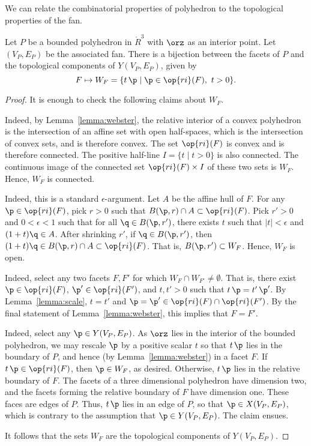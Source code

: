 We can relate the combinatorial properties of polyhedron to the topological
properties of the fan.

\begin{lemma}[]\cutrate{}\label{lemma:WF} 
Let $P$ be a bounded polyhedron in $\ring{R}^3$ with $\orz$ as an
interior point.  Let $(V_P,E_P)$ be the associated fan.  There is a
bijection between the facets of $P$ and the topological components
of $Y(V_P,E_P)$, given by
\[ 
F \mapsto W_F = \{t\, \p \mid \p\in \op{ri}(F),~t >0\}.
\] 
\end{lemma}
%
%
%

\begin{proof} It is enough to check the following claims
about $W_F$.

 Indeed, by Lemma~\ref{lemma:webster},
the relative interior of a convex polyhedron is the intersection of
an affine set with open half-spaces, which is the intersection of
convex sets, and is therefore convex. The set $\op{ri}(F)$ is
convex and is therefore connected.  The positive half-line $I=\{t\mid t>0\}$
is also connected.  The continuous image of the connected set
$\op{ri}(F)\times I$ of these two sets is $W_F$.  Hence, $W_F$ is
connected.

  Indeed, this is a standard
$\epsilon$-argument.  Let $A$ be the affine hull of $F$.  For any
$\p\in \op{ri}(F)$, pick $r>0$ such that $B(\p,r)\cap A\subset
\op{ri}(F)$.  Pick $r'>0$ and $0<\epsilon<1$ such that for all
$\q\in B(\p,r')$, there exists $t$ such that $|t|<\epsilon$ and
$(1+t)\q\in A$.  After shrinking $r'$, if $\q\in B(\p,r')$, then
$(1+t)\q \in B(\p,r)\cap A \subset \op{ri}(F)$.  That is,
$B(\p,r')\subset W_F$.  Hence, $W_F$ is open.

  Indeed, select any two facets $F,F'$ for
which $W_F\cap W_{F'}\ne \emptyset$.  That is, there exist $\p\in
\op{ri}(F)$, $\p'\in \op{ri}(F')$, and $t,t'>0$ such that $t\, \p = t'\,
\p'$.  By Lemma~\ref{lemma:scale}, $t=t'$ and $\p=\p'\in \op{ri}(F)\cap
\op{ri}(F')$.  By the final statement of Lemma~\ref{lemma:webster},
this implies that $F=F'$.

  Indeed,
select any $\p\in Y(V_P,E_P)$.  As $\orz$ lies in the interior of
the bounded polyhedron, we may rescale $\p$ by a positive scalar $t$
so that $t\, \p$ lies in the boundary of $P$, and hence (by
Lemma~\ref{lemma:webster}) in a facet $F$.  If $t\, \p \in
\op{ri}(F)$, then $\p\in W_F$, as desired.  Otherwise, $t\, \p$ lies
in the relative boundary of $F$.  The facets of a three dimensional
polyhedron have dimension two, and the facets forming the relative
boundary of $F$ have dimension one.  These faces are edges of $P$.
Thus, $t\, \p$ lies in an edge of $P$, so that $\p\in X(V_P,E_P)$,
which is contrary to the assumption that $\p\in Y(V_P,E_P)$.  The
claim ensues.

It follows that the sets $W_F$ are the
topological components of $Y(V_P,E_P)$.
\end{proof}
%


